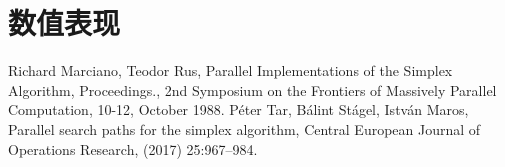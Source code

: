 \documentclass[UTF8,a4paper,10pt]{ctexart}
\begin{document}
\section{数值表现}

\begin{thebibliography}{5}
    Richard Marciano, Teodor Rus, Parallel Implementations of the Simplex Algorithm, Proceedings., 2nd Symposium on the Frontiers of Massively Parallel Computation, 10-12, October 1988.
    Péter Tar, Bálint Stágel, István Maros, Parallel search paths for the simplex algorithm, Central European Journal of Operations Research, (2017) 25:967–984.
\end{thebibliography}
\end{document}
